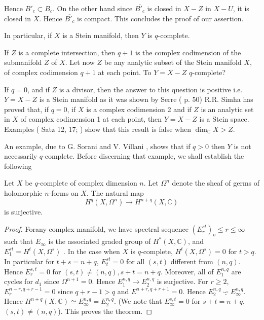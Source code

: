 Hence $B'_c \subset B_c$. On the other hand since
$\overline{B'_c}$ is closed in $X-Z$ in $X-U$, it is closed in $X$. Hence
$\overline{B'_c}$ is compact. This concludes the proof of our assertion.

In particular, if $X$ is a Stein manifold, then $Y$ is $q$-complete. 
          
If $Z$ is a complete intersection, then $q+1$ is the complex codimension
of the  submanifold $Z$ of $X$. Let now $Z$ be any analytic subset of the
Stein manifold $X$, of complex codimension $q+1$ at each point. To $Y=X-Z$
$q$-complete? 
  
If $q=0$, and if $Z$ is a divisor, then the answer to this question is
positive  i.e. $Y=X -Z$ is a Stein manifold as it was shown by Serre
(\cite{key6} p. 50) R.R. Simha \cite{key31}  
has proved that, if $q=0$, if $X$ is a complex codimension 2 and if $Z$
is an analytic  set in $X$ of complex codimension 1 at each point, then
$Y=X-Z$ is a Stein space. Examples (\cite{key23} 
Satz 12, 17; \cite{key14}) show that this result is false when 
$\dim_{\mathbb{C}} X>Z$. 
  
An example, due to G. Sorani and V. Villani \cite{key33} , shows that
if  $q>0$ then $Y$ is not necessarily $q$-complete. Before discerning that
example, we shall establish the following 
  
\begin{theorem}\label{chap4:thm4.6}%
  Let $X$ be $q$-complete of complex dimension $n$.  
  Let $\Omega^{n}$  denote the sheaf of germs of holomorphic $n$-forms
  on $X$. The natural map 
  $$ 
  H^q (X,\Omega^n)\rightarrow H^{n+q} (X, \mathbb{C})
  $$
  is surjective.
\end{theorem}

\begin{proof}
  For\pageoriginale any complex manifold, we have spectral sequence
  $(E^{st}_r)_o\leq r \leq \infty$ such that $E_\infty$ is the
  associated graded group of  
  $H^* (X, \mathbb{C})$, and $E^{st}_1= H^t (X, \Omega^s) $
  \cite{key11}. In the  case when $X$  is 
  $q$-complete, $H^t (X,\Omega^s)=0$ for $t > q$. In particular for 
  $t+s=n+q$, $E^{st}_t=0$ for all $(s,t)$ different from $(n,q)$. Hence
  $E^{s,t}_r=0$ for $(s,t) \neq  (n,q), s+t=n+q$. Moreover, all
  of $E^{n,q}_1$ are 
  cycles for $d_1$ since $\Omega ^{n+1} =0$. Hence $E^{n,q}_1
  \rightarrow E^{n,q}_2$ is surjective.  For $ r \geq 2$, $E^{n-r,
    q+r-1}_r =0$ since $q+r-1 > q$ and $E^{n+r, q+r+1} =0$. Hence
  $E^{n,q}_2  \underline{ \backsim} 
  E^{n,q}_\infty$. 
  Hence $H^{n+q} (X, \mathbb{C}) \simeq
  E^{n,q}_\infty=E^{n,q}_2$. (We note that $E^{s,t}_\infty=0$ for
    $s+t =n+q$, $(s,t) \neq (n,q)$).
This proves the theorem.
\end{proof}


